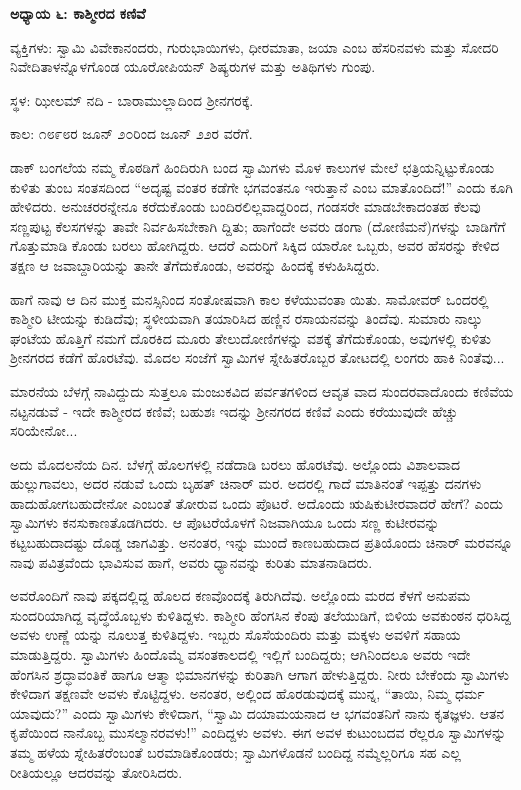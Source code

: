 \textbf{ಅಧ್ಯಾಯ ೬: ಕಾಶ್ಮೀರದ ಕಣಿವೆ}

ವ್ಯಕ್ತಿಗಳು: ಸ್ವಾಮಿ ವಿವೇಕಾನಂದರು, ಗುರುಭಾಯಿಗಳು, ಧೀರಮಾತಾ, ಜಯಾ ಎಂಬ ಹೆಸರಿನವಳು ಮತ್ತು ಸೋದರಿ ನಿವೇದಿತಾಳನ್ನೊಳಗೊಂಡ ಯೂರೋಪಿಯನ್ ಶಿಷ್ಯರುಗಳ ಮತ್ತು ಅತಿಥಿಗಳು ಗುಂಪು.

ಸ್ಥಳ: ಝೀಲಮ್​ ನದಿ - ಬಾರಾಮುಲ್ಲಾದಿಂದ ಶ‍್ರೀನಗರಕ್ಕೆ.

ಕಾಲ: ೧೮೯೮ರ ಜೂನ್ ೨೦ರಿಂದ ಜೂನ್ ೨೨ರ ವರೆಗೆ.

ಡಾಕ್ ಬಂಗಲೆಯ ನಮ್ಮ ಕೊಠಡಿಗೆ ಹಿಂದಿರುಗಿ ಬಂದ ಸ್ವಾಮಿಗಳು ಮೊಳ ಕಾಲುಗಳ ಮೇಲೆ ಛತ್ರಿಯನ್ನಿಟ್ಟುಕೊಂಡು ಕುಳಿತು ತುಂಬ ಸಂತಸದಿಂದ “ಅದೃಷ್ಟ ವಂತರ ಕಡೆಗೇ ಭಗವಂತನೂ ಇರುತ್ತಾನೆ ಎಂಬ ಮಾತೊಂದಿದೆ!” ಎಂದು ಕೂಗಿ ಹೇಳಿದರು. ಅನುಚರರನ್ನೇನೂ ಕರೆದುಕೊಂಡು ಬಂದಿರಲಿಲ್ಲವಾದ್ದರಿಂದ, ಗಂಡಸರೇ ಮಾಡಬೇಕಾದಂತಹ ಕೆಲವು ಸಣ್ಣಪುಟ್ಟ ಕೆಲಸಗಳನ್ನು ತಾವೇ ನಿರ್ವಹಿಸಬೇಕಾಗಿ ದ್ದಿತು; ಹಾಗೆಂದೇ ಅವರು ಡಂಗಾ (ದೋಣಿಮನೆ)ಗಳನ್ನು ಬಾಡಿಗೆಗೆ ಗೊತ್ತುಮಾಡಿ ಕೊಂಡು ಬರಲು ಹೋಗಿದ್ದರು. ಆದರೆ ಎದುರಿಗೆ ಸಿಕ್ಕಿದ ಯಾರೋ ಒಬ್ಬರು, ಅವರ ಹೆಸರನ್ನು ಕೇಳಿದ ತಕ್ಷಣ ಆ ಜವಾಬ್ದಾರಿಯನ್ನು ತಾನೇ ತೆಗೆದುಕೊಂಡು, ಅವರನ್ನು ಹಿಂದಕ್ಕೆ ಕಳುಹಿಸಿದ್ದರು.

ಹಾಗೆ ನಾವು ಆ ದಿನ ಮುಕ್ತ ಮನಸ್ಸಿನಿಂದ ಸಂತೋಷವಾಗಿ ಕಾಲ ಕಳೆಯುವಂತಾ ಯಿತು. ಸಾಮೋವರ್ ಒಂದರಲ್ಲಿ ಕಾಶ್ಮೀರಿ ಟೀಯನ್ನು ಕುಡಿದೆವು; ಸ್ಥಳೀಯವಾಗಿ ತಯಾರಿಸಿದ ಹಣ್ಣಿನ ರಸಾಯನವನ್ನು ತಿಂದೆವು. ಸುಮಾರು ನಾಲ್ಕು ಘಂಟೆಯ ಹೊತ್ತಿಗೆ ನಮಗೆ ದೊರಕಿದ ಮೂರು ತೇಲುದೋಣಿಗಳನ್ನು ವಶಕ್ಕೆ ತೆಗೆದುಕೊಂಡು, ಅವುಗಳಲ್ಲಿ ಕುಳಿತು ಶ‍್ರೀನಗರದ ಕಡೆಗೆ ಹೊರಟೆವು. ಮೊದಲ ಸಂಜೆಗೆ ಸ್ವಾಮಿಗಳ ಸ್ನೇಹಿತರೊಬ್ಬರ ತೋಟದಲ್ಲಿ ಲಂಗರು ಹಾಕಿ ನಿಂತೆವು...

ಮಾರನೆಯ ಬೆಳಗ್ಗೆ ನಾವಿದ್ದುದು ಸುತ್ತಲೂ ಮಂಜುಕವಿದ ಪರ್ವತಗಳಿಂದ ಆವೃತ ವಾದ ಸುಂದರವಾದೊಂದು ಕಣಿವೆಯ ನಟ್ಟನಡುವೆ - ಇದೇ ಕಾಶ್ಮೀರದ ಕಣಿವೆ; ಬಹುಶಃ ಇದನ್ನು ಶ‍್ರೀನಗರದ ಕಣಿವೆ ಎಂದು ಕರೆಯುವುದೇ ಹೆಚ್ಚು ಸರಿಯೇನೋ...

ಅದು ಮೊದಲನೆಯ ದಿನ. ಬೆಳಗ್ಗೆ ಹೊಲಗಳಲ್ಲಿ ನಡೆದಾಡಿ ಬರಲು ಹೊರಟೆವು. ಅಲ್ಲೊಂದು ವಿಶಾಲವಾದ ಹುಲ್ಲುಗಾವಲು, ಅದರ ನಡುವೆ ಒಂದು ಬೃಹತ್ ಚಿನಾರ್ ಮರ. ಅದರಲ್ಲಿ ಗಾದೆ ಮಾತಿನಂತೆ ಇಪ್ಪತ್ತು ದನಗಳು ಹಾದುಹೋಗಬಹುದೇನೋ ಎಂಬಂತೆ ತೋರುವ ಒಂದು ಪೊಟರೆ. ಅದೊಂದು ಋಷಿಕುಟೀರವಾದರೆ ಹೇಗೆ? ಎಂದು ಸ್ವಾಮಿಗಳು ಕನಸುಕಾಣತೊಡಗಿದರು. ಆ ಪೊಟರೆಯೊಳಗೆ ನಿಜವಾಗಿಯೂ ಒಂದು ಸಣ್ಣ ಕುಟೀರವನ್ನು ಕಟ್ಟಬಹುದಾದಷ್ಟು ದೊಡ್ಡ ಜಾಗವಿತ್ತು. ಅನಂತರ, ಇನ್ನು ಮುಂದೆ ಕಾಣಬಹುದಾದ ಪ್ರತಿಯೊಂದು ಚಿನಾರ್ ಮರವನ್ನೂ ನಾವು ಪವಿತ್ರವೆಂದು ಭಾವಿಸುವ ಹಾಗೆ, ಅವರು ಧ್ಯಾನವನ್ನು ಕುರಿತು ಮಾತನಾಡಿದರು.

ಅವರೊಂದಿಗೆ ನಾವು ಪಕ್ಕದಲ್ಲಿದ್ದ ಹೊಲದ ಕಣವೊಂದಕ್ಕೆ ತಿರುಗಿದೆವು. ಅಲ್ಲೊಂದು ಮರದ ಕೆಳಗೆ ಅನುಪಮ ಸುಂದರಿಯಾಗಿದ್ದ ವೃದ್ಧೆಯೊಬ್ಬಳು ಕುಳಿತಿದ್ದಳು. ಕಾಶ್ಮೀರಿ ಹೆಂಗಸಿನ ಕೆಂಪು ತಲೆಯುಡಿಗೆ, ಬಿಳಿಯ ಅವಕುಂಠನ ಧರಿಸಿದ್ದ ಅವಳು ಉಣ್ಣೆ ಯನ್ನು ನೂಲುತ್ತ ಕುಳಿತಿದ್ದಳು. ಇಬ್ಬರು ಸೊಸೆಯಂದಿರು ಮತ್ತು ಮಕ್ಕಳು ಅವಳಿಗೆ ಸಹಾಯ ಮಾಡುತ್ತಿದ್ದರು. ಸ್ವಾಮಿಗಳು ಹಿಂದೊಮ್ಮೆ ವಸಂತಕಾಲದಲ್ಲಿ ಇಲ್ಲಿಗೆ ಬಂದಿದ್ದರು; ಆಗಿನಿಂದಲೂ ಅವರು ಇದೇ ಹೆಂಗಸಿನ ಶ್ರದ್ಧಾವಂತಿಕೆ ಹಾಗೂ ಆತ್ಮಾ ಭಿಮಾನಗಳನ್ನು ಕುರಿತಾಗಿ ಆಗಾಗ ಹೇಳುತ್ತಿದ್ದರು. ನೀರು ಬೇಕೆಂದು ಸ್ವಾಮಿಗಳು ಕೇಳಿದಾಗ ತಕ್ಷಣವೇ ಅವಳು ಕೊಟ್ಟಿದ್ದಳು. ಅನಂತರ, ಅಲ್ಲಿಂದ ಹೊರಡುವುದಕ್ಕೆ ಮುನ್ನ, “ತಾಯಿ, ನಿಮ್ಮ ಧರ್ಮ ಯಾವುದು?” ಎಂದು ಸ್ವಾಮಿಗಳು ಕೇಳಿದಾಗ, “ಸ್ವಾಮಿ ದಯಾಮಯನಾದ ಆ ಭಗವಂತನಿಗೆ ನಾನು ಕೃತಜ್ಞಳು. ಆತನ ಕೃಪೆಯಿಂದ ನಾನೊಬ್ಬ ಮುಸಲ್ಮಾನರವಳು!” ಎಂದಿದ್ದಳು ಅವಳು. ಈಗ ಅವಳ ಕುಟುಂಬದವ ರೆಲ್ಲರೂ ಸ್ವಾಮಿಗಳನ್ನು ತಮ್ಮ ಹಳೆಯ ಸ್ನೇಹಿತರೆಂಬಂತೆ ಬರಮಾಡಿಕೊಂಡರು; ಸ್ವಾಮಿಗಳೊಡನೆ ಬಂದಿದ್ದ ನಮ್ಮೆಲ್ಲರಿಗೂ ಸಹ ಎಲ್ಲ ರೀತಿಯಲ್ಲೂ ಆದರವನ್ನು ತೋರಿಸಿದರು.

